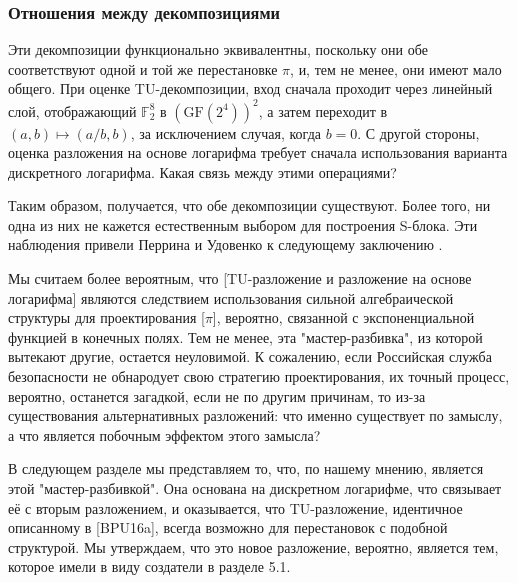 \subsubsection{Отношения между декомпозициями}

Эти декомпозиции функционально эквивалентны, поскольку они обе соответствуют одной и той же перестановке \(\pi\), и, тем не менее, они имеют мало общего. При оценке TU-декомпозиции, вход сначала проходит через линейный слой, отображающий \(\mathbb{F}_2^8\) в \((\text{GF}(2^4))^2\), а затем переходит в \((a, b) \mapsto (a/b, b)\), за исключением случая, когда \(b = 0\). С другой стороны, оценка разложения на основе логарифма требует сначала использования варианта дискретного логарифма. Какая связь между этими операциями?

Таким образом, получается, что обе декомпозиции существуют. Более того, ни одна из них не кажется естественным выбором для построения S-блока. Эти наблюдения привели Перрина и Удовенко к следующему заключению \cite{PU16}.

Мы считаем более вероятным, что [TU-разложение и разложение на основе логарифма] являются следствием использования сильной алгебраической структуры для проектирования [\(\pi\)], вероятно, связанной с экспоненциальной функцией в конечных полях. Тем не менее, эта "мастер-разбивка", из которой вытекают другие, остается неуловимой. К сожалению, если Российская служба безопасности не обнародует свою стратегию проектирования, их точный процесс, вероятно, останется загадкой, если не по другим причинам, то из-за существования альтернативных разложений: что именно существует по замыслу, а что является побочным эффектом этого замысла?

В следующем разделе мы представляем то, что, по нашему мнению, является этой "мастер-разбивкой". Она основана на дискретном логарифме, что связывает её с вторым разложением, и оказывается, что TU-разложение, идентичное описанному в [BPU16a], всегда возможно для перестановок с подобной структурой. Мы утверждаем, что это новое разложение, вероятно, является тем, которое имели в виду создатели в разделе 5.1.